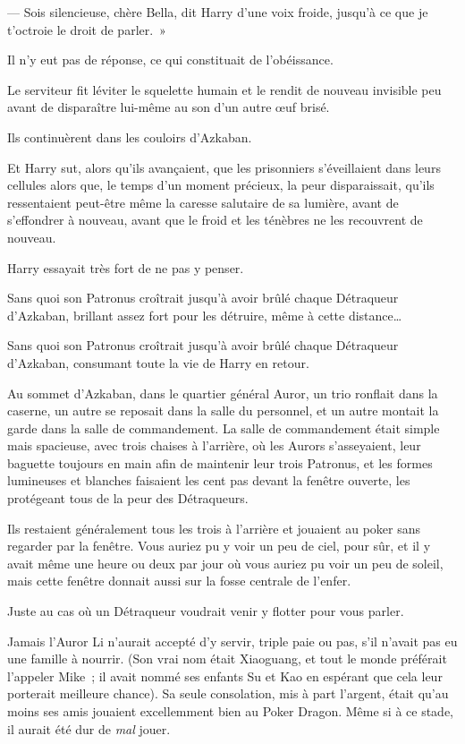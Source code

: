 --- Sois silencieuse, chère Bella, dit Harry d'une voix froide, jusqu'à ce que je t'octroie le droit de parler.~»

Il n'y eut pas de réponse, ce qui constituait de l'obéissance.

Le serviteur fit léviter le squelette humain et le rendit de nouveau invisible peu avant de disparaître lui-même au son d'un autre œuf brisé.

Ils continuèrent dans les couloirs d'Azkaban.

Et Harry sut, alors qu'ils avançaient, que les prisonniers s'éveillaient dans leurs cellules alors que, le temps d'un moment précieux, la peur disparaissait, qu'ils ressentaient peut-être même la caresse salutaire de sa lumière, avant de s'effondrer à nouveau, avant que le froid et les ténèbres ne les recouvrent de nouveau.

Harry essayait très fort de ne pas y penser.

Sans quoi son Patronus croîtrait jusqu'à avoir brûlé chaque Détraqueur d'Azkaban, brillant assez fort pour les détruire, même à cette distance…

Sans quoi son Patronus croîtrait jusqu'à avoir brûlé chaque Détraqueur d'Azkaban, consumant toute la vie de Harry en retour.

\later

Au sommet d'Azkaban, dans le quartier général Auror, un trio ronflait dans la caserne, un autre se reposait dans la salle du personnel, et un autre montait la garde dans la salle de commandement.
La salle de commandement était simple mais spacieuse, avec trois chaises à l'arrière, où les Aurors s'asseyaient, leur baguette toujours en main afin de maintenir leur trois Patronus, et les formes lumineuses et blanches faisaient les cent pas devant la fenêtre ouverte, les protégeant tous de la peur des Détraqueurs.

Ils restaient généralement tous les trois à l'arrière et jouaient au poker sans regarder par la fenêtre.
Vous auriez pu y voir un peu de ciel, pour sûr, et il y avait même une heure ou deux par jour où vous auriez pu voir un peu de soleil, mais cette fenêtre donnait aussi sur la fosse centrale de l'enfer.

Juste au cas où un Détraqueur voudrait venir y flotter pour vous parler.

Jamais l'Auror Li n'aurait accepté d'y servir, triple paie ou pas, s'il n'avait pas eu une famille à nourrir.
(Son vrai nom était Xiaoguang, et tout le monde préférait l'appeler Mike~; il avait nommé ses enfants Su et Kao en espérant que cela leur porterait meilleure chance).
Sa seule consolation, mis à part l'argent, était qu'au moins ses amis jouaient excellemment bien au Poker Dragon.
Même si à ce stade, il aurait été dur de \emph{mal} jouer.

